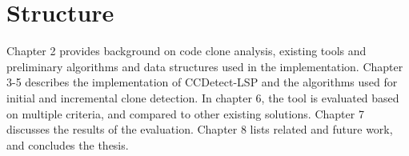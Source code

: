 \section{Structure}

Chapter 2 provides background on code clone analysis, existing tools and preliminary
algorithms and data structures used in the implementation. Chapter 3-5 describes the
implementation of CCDetect-LSP and the algorithms used for initial and incremental clone
detection. In chapter 6, the tool is evaluated based on multiple criteria, and compared to
other existing solutions. Chapter 7 discusses the results of the evaluation. Chapter 8
lists related and future work, and concludes the thesis.
